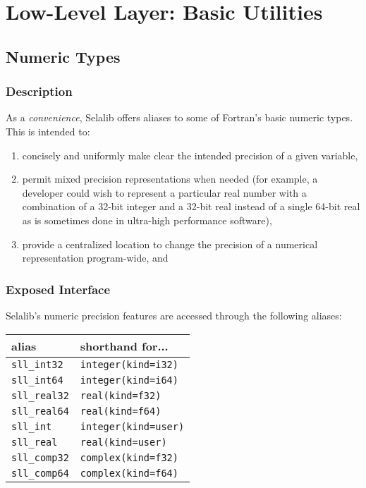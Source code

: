 \documentclass[]{report}   %
\begin{document}

\chapter{Low-Level Layer: Basic Utilities}           %


\section{Numeric Types}     %
\subsection{Description}
As a \emph{convenience}, Selalib offers aliases to some of Fortran's basic numeric types. This is intended to:
\begin{enumerate}
\item concisely and uniformly make clear the intended precision of a given variable, 
\item permit mixed precision representations when needed (for example, a developer could wish to represent a particular real number with a combination of a 32-bit integer and a 32-bit real instead of a single 64-bit real as is sometimes done in ultra-high performance software), 
\item provide a centralized location to change the precision of a numerical representation program-wide, and
\end{enumerate}

\subsection{Exposed Interface}         %
Selalib's numeric precision features are accessed through the following aliases:

\vspace{+0.5cm}
\begin{tabular}{l l}
alias & shorthand for... \\
\hline
\verb+sll_int32+ & \verb+integer(kind=i32)+ \\
\verb+sll_int64+ & \verb+integer(kind=i64)+ \\
\verb+sll_real32+ & \verb+real(kind=f32)+ \\
\verb+sll_real64+ & \verb+real(kind=f64)+ \\
\verb+sll_int+  & \verb+integer(kind=user)+ \\
\verb+sll_real+ & \verb+real(kind=user)+ \\
\verb+sll_comp32+ & \verb+complex(kind=f32)+\\
\verb+sll_comp64+ & \verb+complex(kind=f64)+\\
\hline
\end{tabular}
\vspace{+0.5cm}
\end{document}

